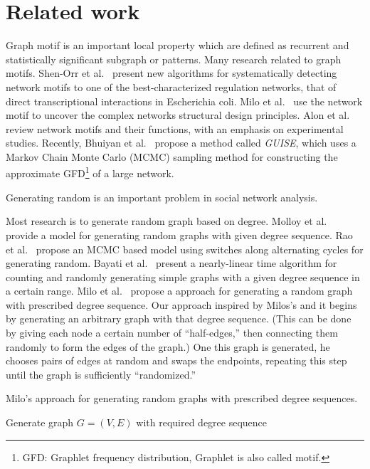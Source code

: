 \section{Related work}
\label{sec:related}

 Graph motif is an important local property which are defined as recurrent and statistically significant subgraph or patterns. Many research related to graph motifs. 
Shen-Orr et al.~\cite{shen2002network} present new algorithms for systematically detecting network motifs to one of the best-characterized regulation networks, that of direct transcriptional interactions in Escherichia coli. 
Milo et al.~\cite{milo2002network} use the network motif to uncover the complex networks structural design principles.
Alon et al.~\cite{alon2007network} review network motifs and their functions, with an emphasis on experimental studies.
Recently, Bhuiyan et al.~\cite{bhuiyan2012guise} propose a method called \textit{GUISE}, which uses a Markov Chain Monte Carlo (MCMC) sampling method for constructing the approximate GFD\footnote{GFD: Graphlet frequency distribution, Graphlet is also called motif.} of a large network.

 Generating random is an important problem in social network analysis. 

Most research is to generate random graph based on degree. 
Molloy et al.~\cite{molloy1995critical} provide a model for generating random graphs with given degree sequence. 
Rao et al.~\cite{rao1996markov} propose an MCMC based model using switches along alternating cycles for generating random. 
Bayati et al.~\cite{bayati2010sequential} present a nearly-linear time algorithm for counting and randomly generating simple graphs with a given degree sequence in a certain range. 
Milo et al.~\cite{milo04random} propose a approach for generating a random graph with prescribed degree sequence. Our approach inspired by Milos's and it begins by generating an arbitrary graph with that degree sequence.  (This can be done by giving each node a certain number of ``half-edges,'' then connecting them randomly to form the edges of the graph.)  One this graph is generated, he chooses pairs of edges at random and swaps the endpoints, repeating this step until the graph is sufficiently ``randomized.''

\begin{algorithm}
\caption{Milo's approach for generating random graphs with prescribed degree sequences.}
\label{algorithm:milo}
\begin{algorithmic}
Generate graph $G = (V, E)$ with required degree sequence\\
\end{algorithmic}
\end{algorithm}

